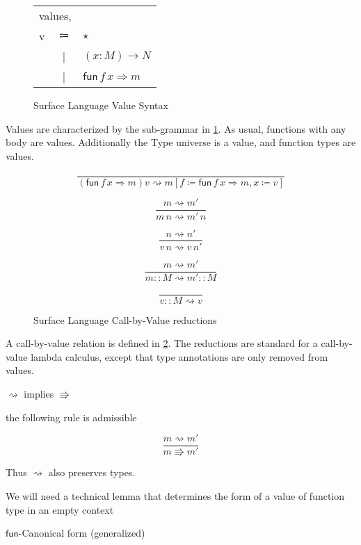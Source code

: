 \begin{figure}
\begin{tabular}{lcl}
\multicolumn{3}{l}{values,}\tabularnewline
v & $\Coloneqq$ & $\star$\tabularnewline
  & | & $\left(x:M\right)\rightarrow N$\tabularnewline
  & | & $\mathsf{fun}\,f\,x\Rightarrow m$\tabularnewline
\end{tabular}\caption{Surface Language Value Syntax}
\label{fig:surface-value-syntax}
\end{figure}

Values are characterized by the sub-grammar in \ref{fig:surface-value-syntax}.
As usual, functions with any body are values.
Additionally the Type universe is a value, and function types are values.

\begin{figure}
\[
\frac{\,}{\left(\mathsf{fun}\,f\,x\Rightarrow m\right)v\rightsquigarrow m\left[f\coloneqq\mathsf{fun}\,f\,x\Rightarrow m,x\coloneqq v\right]}
\]

\[
\frac{m\rightsquigarrow m'}{m\,n\rightsquigarrow m'\,n}
\]

\[
\frac{n\rightsquigarrow n'}{v\,n\rightsquigarrow v\,n'}
\]

\[
\frac{m\rightsquigarrow m'}{m::M\rightsquigarrow m'::M}
\]

\[
\frac{\,}{v::M\rightsquigarrow v}
\]

\caption{Surface Language Call-by-Value reductions}
\label{fig:surface-reduction-step}
\end{figure}

A call-by-value relation is defined in \ref{fig:surface-reduction-step}.
The reductions are standard for a call-by-value lambda calculus, except that type annotations are only removed from values.

\begin{fact}
$\rightsquigarrow$ implies $\Rrightarrow$

the following rule is admissible

\[
\frac{m\rightsquigarrow m'}{m\Rrightarrow m'}
\]
\end{fact}

Thus $\rightsquigarrow$ also preserves types.

We will need a technical lemma that determines the form of a value of function type in an empty context

\begin{lem}
  $\mathsf{fun}$-Canonical form (generalized)
  \end{lem}
  
